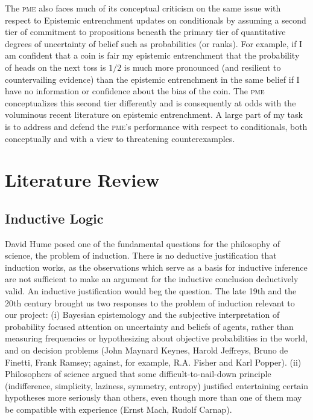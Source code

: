 \documentclass[11pt]{article}
\begin{document}
The \textsc{pme} also faces much of its conceptual criticism on the
same issue with respect to  Epistemic
entrenchment updates on conditionals by assuming a second tier of
commitment to propositions beneath the primary tier of quantitative
degrees of uncertainty of belief such as probabilities (or ranks). For
example, if I am confident that a coin is fair my epistemic
entrenchment that the probability of heads on the next toss is $1/2$
is much more pronounced (and resilient to countervailing evidence)
than the epistemic entrenchment in the same belief if I have no
information or confidence about the bias of the coin. The \textsc{pme}
conceptualizes this second tier differently and is consequently at
odds with the voluminous recent literature on epistemic entrenchment.
A large part of my task is to address and defend the \textsc{pme}'s
performance with respect to conditionals, both conceptually and with a
view to threatening counterexamples.

\section{Literature Review}
\label{LiteratureReview}

\subsection{Inductive Logic}
\label{InductiveLogicAndEntropy}

David Hume posed one of the fundamental questions for the philosophy
of science, the problem of induction. There is no deductive
justification that induction works, as the observations which serve as
a basis for inductive inference are not sufficient to make an argument
for the inductive conclusion deductively valid. An inductive
justification would beg the question. The late 19th and the 20th
century brought us two responses to the problem of induction relevant
to our project: (i) Bayesian epistemology and the subjective
interpretation of probability focused attention on uncertainty and
beliefs of agents, rather than measuring frequencies or hypothesizing
about objective probabilities in the world, and on decision problems
(John Maynard Keynes, Harold Jeffreys, Bruno de Finetti, Frank Ramsey;
against, for example, R.A. Fisher and Karl Popper). (ii) Philosophers
of science argued that some difficult-to-nail-down principle
(indifference, simplicity, laziness, symmetry, entropy) justified
entertaining certain hypotheses more seriously than others, even
though more than one of them may be compatible with experience (Ernst
Mach, Rudolf Carnap).
\end{document}
